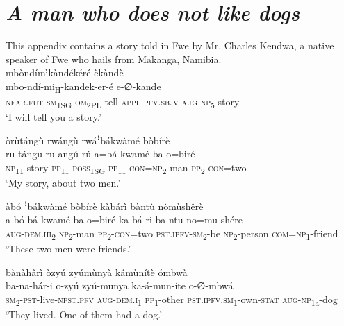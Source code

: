 \chapter{\textit{A man who does not like dogs}}

This appendix contains a story told in Fwe by Mr. Charles Kendwa, a native speaker of Fwe who hails from Makanga, Namibia.\\

\noindent mbòndímìkàndékéré èkàndè \\
\gll mbo-ndí̲-mi\textsubscript{H}{}-kandek-er-é̲      e-∅-kande\\
\textsc{near}.\textsc{fut}{}-\textsc{sm}\textsubscript{1SG}{}-\textsc{om}\textsubscript{2PL}{}-tell-\textsc{appl}{}-\textsc{pfv}.\textsc{sbjv}  \textsc{aug}{}-\textsc{np}\textsubscript{5}\--story\\
\glt ‘I will tell you a story.’\bigskip

òrùtángù rwángù rwáꜝbákwàmé bòbírè\\
\gll ru-tángu  ru-angú  rú-a=bá-kwamé  ba-o=biré\\
\textsc{np}\textsubscript{11}{}-story  \textsc{pp}\textsubscript{11}{}-\textsc{poss}\textsubscript{1SG} \textsc{pp}\textsubscript{11}{}-\textsc{con}=\textsc{np}\textsubscript{2}{}-man  \textsc{pp}\textsubscript{2}{}-\textsc{con}=two\\
\glt ‘My story, about two men.’\bigskip
 
àbó ꜝbákwàmé bòbírè kàbárì bàntù nòmùshêrè\\
\gll a-bó    bá-kwamé  ba-o=biré ka-bá̲-ri    ba-ntu  no=mu-shére\\
\textsc{aug}{}-\textsc{dem}.\textsc{iii}\textsubscript{2}  \textsc{np}\textsubscript{2}{}-man  \textsc{pp}\textsubscript{2}{}-\textsc{con}=two
\textsc{pst}.\textsc{ipfv}{}-\textsc{sm}\textsubscript{2}{}-be  \textsc{np}\textsubscript{2}{}-person  \textsc{com}=\textsc{np}\textsubscript{1}{}-friend\\
\glt ‘These two men were friends.’\bigskip

bànàhârì òzyú zyúmùnyà kámùnítè ómbwà\\
\gll ba-na-hár-i o-zyú    zyú-munya  ka-á̲-mun-í̲te    o-∅-mbwá \\
\textsc{sm}\textsubscript{2}{}-\textsc{pst}{}-live-\textsc{npst}.\textsc{pfv}
\textsc{aug}{}-\textsc{dem}.\textsc{i}\textsubscript{1}  \textsc{pp}\textsubscript{1}{}-other  \textsc{pst}.\textsc{ipfv}.\textsc{sm}\textsubscript{1}{}-own-\textsc{stat}  \textsc{aug}{}-\textsc{np}\textsubscript{1a}{}-dog\\
\glt ‘They lived. One of them had a dog.’\bigskip

